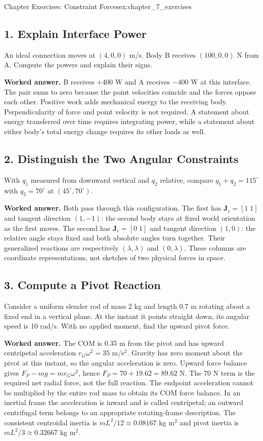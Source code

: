 \begin{exercises}{Chapter Exercises: Constraint Forces}{ex:chapter_7_exercises}

\subsection*{1. Explain Interface Power}
An ideal connection moves at $(4,0,0)$ m/s. Body B receives $(100,0,0)$ N from A. Compute the powers and explain their signs.

\textbf{Worked answer.} B receives $+400$ W and A receives $-400$ W at this interface. The pair sums to zero because the point velocities coincide and the forces oppose each other. Positive work adds mechanical energy to the receiving body. Perpendicularity of force and point velocity is not required. A statement about energy transferred over time requires integrating power, while a statement about either body's total energy change requires its other loads as well.

\subsection*{2. Distinguish the Two Angular Constraints}
With $q_1$ measured from downward vertical and $q_2$ relative, compare $q_1+q_2=115^\circ$ with $q_2=70^\circ$ at $(45^\circ,70^\circ)$.

\textbf{Worked answer.} Both pass through this configuration. The first has $\bm J_c=[1\;1]$ and tangent direction $(1,-1)$: the second body stays at fixed world orientation as the first moves. The second has $\bm J_c=[0\;1]$ and tangent direction $(1,0)$: the relative angle stays fixed and both absolute angles turn together. Their generalized reactions are respectively $(\lambda,\lambda)$ and $(0,\lambda)$. These columns are coordinate representations, not sketches of two physical forces in space.

\subsection*{3. Compute a Pivot Reaction}
Consider a uniform slender rod of mass 2 kg and length 0.7 m rotating about a fixed end in a vertical plane. At the instant it points straight down, its angular speed is 10 rad/s. With no applied moment, find the upward pivot force.

\textbf{Worked answer.} The COM is 0.35 m from the pivot and has upward centripetal acceleration $r_G\omega^2=35$ m/s$^2$. Gravity has zero moment about the pivot at this instant, so the angular acceleration is zero. Upward force balance gives $F_P-mg=mr_G\omega^2$, hence $F_P=70+19.62=89.62$ N. The 70 N term is the required net radial force, not the full reaction. The endpoint acceleration cannot be multiplied by the entire rod mass to obtain its COM force balance. In an inertial frame the acceleration is inward and is called centripetal; an outward centrifugal term belongs to an appropriate rotating-frame description. The consistent centroidal inertia is $mL^2/12\approx0.08167$ kg m$^2$ and pivot inertia is $mL^2/3\approx0.32667$ kg m$^2$.


\end{exercises}

